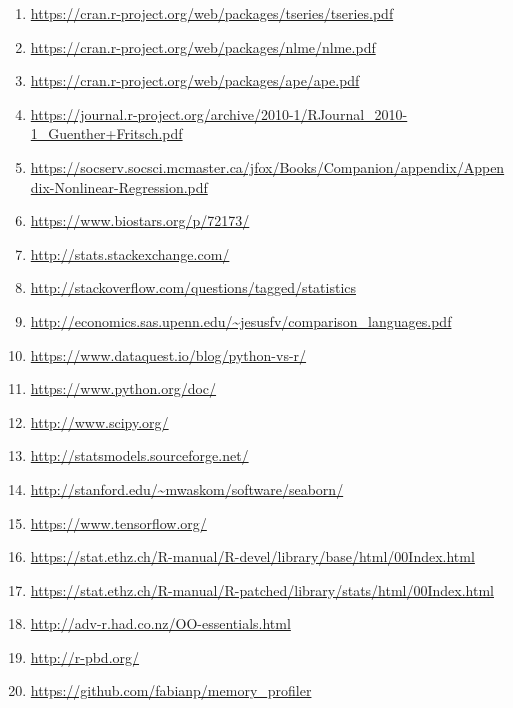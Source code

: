 \documentclass[
  twoside,
  11pt, a4paper,
  footinclude=true,
  headinclude=true,
  cleardoublepage=empty
]{scrreprt}
\begin{document}
\begin{enumerate}
    \item \url{https://cran.r-project.org/web/packages/tseries/tseries.pdf}
    \item \url{https://cran.r-project.org/web/packages/nlme/nlme.pdf}
    \item \url{https://cran.r-project.org/web/packages/ape/ape.pdf}
    \item \url{https://journal.r-project.org/archive/2010-1/RJournal_2010-1_Guenther+Fritsch.pdf}
    \item \url{https://socserv.socsci.mcmaster.ca/jfox/Books/Companion/appendix/Appendix-Nonlinear-Regression.pdf} 
    \item \url{https://www.biostars.org/p/72173/}
    \item \url{http://stats.stackexchange.com/}
    \item \url{http://stackoverflow.com/questions/tagged/statistics}
    \item \url{http://economics.sas.upenn.edu/~jesusfv/comparison_languages.pdf}
    \item \url{https://www.dataquest.io/blog/python-vs-r/}
    \item \url{https://www.python.org/doc/}
    \item \url{http://www.scipy.org/}
    \item \url{http://statsmodels.sourceforge.net/}
    \item \url{http://stanford.edu/~mwaskom/software/seaborn/}
    \item \url{https://www.tensorflow.org/}
    \item \url{https://stat.ethz.ch/R-manual/R-devel/library/base/html/00Index.html}
    \item \url{https://stat.ethz.ch/R-manual/R-patched/library/stats/html/00Index.html}
    \item \url{http://adv-r.had.co.nz/OO-essentials.html}
    \item \url{http://r-pbd.org/}
    \item \url{https://github.com/fabianp/memory_profiler} 
\end{enumerate}
\fi
\end{document}
